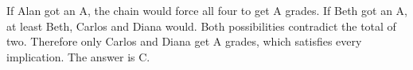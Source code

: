 If Alan got an A, the chain would force all four to get A grades. If Beth got an A, at least Beth, Carlos and Diana would. Both possibilities contradict the total of two. Therefore only Carlos and Diana get A grades, which satisfies every implication. The answer is $\boxed{\text{C}}$.
